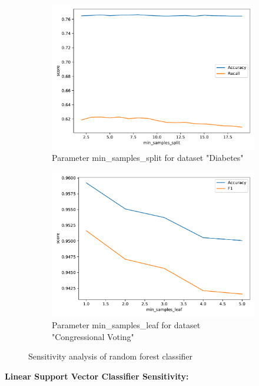 \documentclass[a4paper,10pt]{article}
\begin{document}
\begin{figure}[h!]
\begin{subfigure}[b]{0.45\textwidth}
        \includegraphics[width=\textwidth]{diabetes/plots/rf_min_samples_split_sensitivity.pdf}
        \caption{Parameter \textsf{min\_samples\_split} for dataset "Diabetes"}
    \end{subfigure}
    \hfill
    \begin{subfigure}[b]{0.45\textwidth}
        \includegraphics[width=\textwidth]{congress/plots/RandomForestClassifier_min_samples_leaf_sensitivity.pdf}
        \caption{Parameter \textsf{min\_samples\_leaf} for dataset "Congressional Voting"}
    \end{subfigure}
    \caption{Sensitivity analysis of random forest classifier}
    \label{fig: sensitivity rf}
\end{figure}


\textbf{Linear Support Vector Classifier Sensitivity:}
\end{document}
